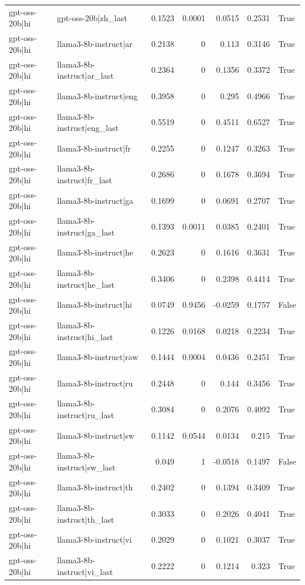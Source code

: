 \begin{table}
\begin{tabular}{l l r r r r l}
gpt-oss-20b|hi & gpt-oss-20b|zh_last & 0.1523 & 0.0001 & 0.0515 & 0.2531 & True \\
gpt-oss-20b|hi & llama3-8b-instruct|ar & 0.2138 & 0 & 0.113 & 0.3146 & True \\
gpt-oss-20b|hi & llama3-8b-instruct|ar_last & 0.2364 & 0 & 0.1356 & 0.3372 & True \\
gpt-oss-20b|hi & llama3-8b-instruct|eng & 0.3958 & 0 & 0.295 & 0.4966 & True \\
gpt-oss-20b|hi & llama3-8b-instruct|eng_last & 0.5519 & 0 & 0.4511 & 0.6527 & True \\
gpt-oss-20b|hi & llama3-8b-instruct|fr & 0.2255 & 0 & 0.1247 & 0.3263 & True \\
gpt-oss-20b|hi & llama3-8b-instruct|fr_last & 0.2686 & 0 & 0.1678 & 0.3694 & True \\
gpt-oss-20b|hi & llama3-8b-instruct|ga & 0.1699 & 0 & 0.0691 & 0.2707 & True \\
gpt-oss-20b|hi & llama3-8b-instruct|ga_last & 0.1393 & 0.0011 & 0.0385 & 0.2401 & True \\
gpt-oss-20b|hi & llama3-8b-instruct|he & 0.2623 & 0 & 0.1616 & 0.3631 & True \\
gpt-oss-20b|hi & llama3-8b-instruct|he_last & 0.3406 & 0 & 0.2398 & 0.4414 & True \\
gpt-oss-20b|hi & llama3-8b-instruct|hi & 0.0749 & 0.9456 & -0.0259 & 0.1757 & False \\
gpt-oss-20b|hi & llama3-8b-instruct|hi_last & 0.1226 & 0.0168 & 0.0218 & 0.2234 & True \\
gpt-oss-20b|hi & llama3-8b-instruct|raw & 0.1444 & 0.0004 & 0.0436 & 0.2451 & True \\
gpt-oss-20b|hi & llama3-8b-instruct|ru & 0.2448 & 0 & 0.144 & 0.3456 & True \\
gpt-oss-20b|hi & llama3-8b-instruct|ru_last & 0.3084 & 0 & 0.2076 & 0.4092 & True \\
gpt-oss-20b|hi & llama3-8b-instruct|sw & 0.1142 & 0.0544 & 0.0134 & 0.215 & True \\
gpt-oss-20b|hi & llama3-8b-instruct|sw_last & 0.049 & 1 & -0.0518 & 0.1497 & False \\
gpt-oss-20b|hi & llama3-8b-instruct|th & 0.2402 & 0 & 0.1394 & 0.3409 & True \\
gpt-oss-20b|hi & llama3-8b-instruct|th_last & 0.3033 & 0 & 0.2026 & 0.4041 & True \\
gpt-oss-20b|hi & llama3-8b-instruct|vi & 0.2029 & 0 & 0.1021 & 0.3037 & True \\
gpt-oss-20b|hi & llama3-8b-instruct|vi_last & 0.2222 & 0 & 0.1214 & 0.323 & True \\

\end{tabular}
\end{table}
